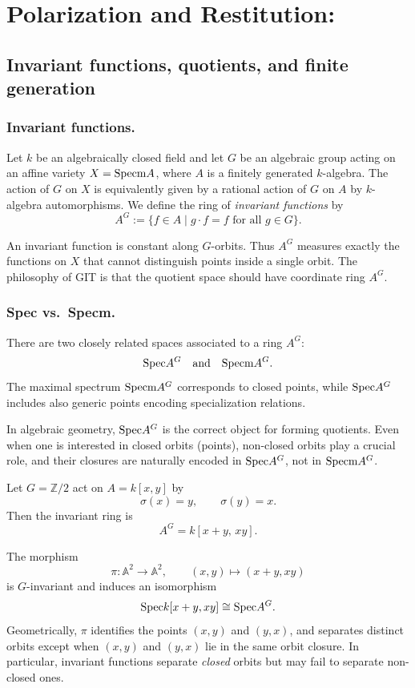 

\chapter{Polarization and Restitution:}

\section{Invariant functions, quotients, and finite generation}

\subsection{Invariant functions.}
Let $k$ be an algebraically closed field and let $G$ be an algebraic group acting on an affine variety
$X = \text{Specm} A$, where $A$ is a finitely generated $k$-algebra.
The action of $G$ on $X$ is equivalently given by a rational action of $G$ on $A$ by $k$-algebra automorphisms.
We define the ring of \emph{invariant functions} by
\[
A^G := \{ f \in A \mid g \cdot f = f \text{ for all } g \in G \}.
\]

\begin{remark}
	An invariant function is constant along $G$-orbits.
	Thus $A^G$ measures exactly the functions on $X$ that cannot distinguish points inside a single orbit.
	The philosophy of GIT is that the quotient space should have coordinate ring $A^G$.
\end{remark}

\subsection{Spec vs.\ Specm.}
There are two closely related spaces associated to a ring $A^G$:
\[
\text{Spec} A^G \quad \text{and} \quad \text{Specm} A^G.
\]
The maximal spectrum $\text{Specm} A^G$ corresponds to closed points, while $\text{Spec} A^G$ includes also
generic points encoding specialization relations.

\begin{remark}
	In algebraic geometry, $\text{Spec} A^G$ is the correct object for forming quotients.
	Even when one is interested in closed orbits (points), non-closed orbits play a crucial role, and
	their closures are naturally encoded in $\text{Spec} A^G$, not in $\text{Specm} A^G$.
\end{remark}

\begin{example}
Let $G = \mathbb{Z}/2$ act on $A = k[x,y]$ by
\[
\sigma(x) = y, \qquad \sigma(y) = x.
\]
Then the invariant ring is
\[
A^G = k[x+y,\, xy].
\]


	The morphism
	\[
	\pi : \mathbb{A}^2 \to \mathbb{A}^2, \qquad (x,y) \mapsto (x+y, xy)
	\]
	is $G$-invariant and induces an isomorphism
	\[
	\text{Spec} k[x+y,xy] \cong \text{Spec} A^G.
	\]
	Geometrically, $\pi$ identifies the points $(x,y)$ and $(y,x)$, and separates distinct orbits except
	when $(x,y)$ and $(y,x)$ lie in the same orbit closure.
	In particular, invariant functions separate \emph{closed} orbits but may fail to separate non-closed ones.
\end{example}

